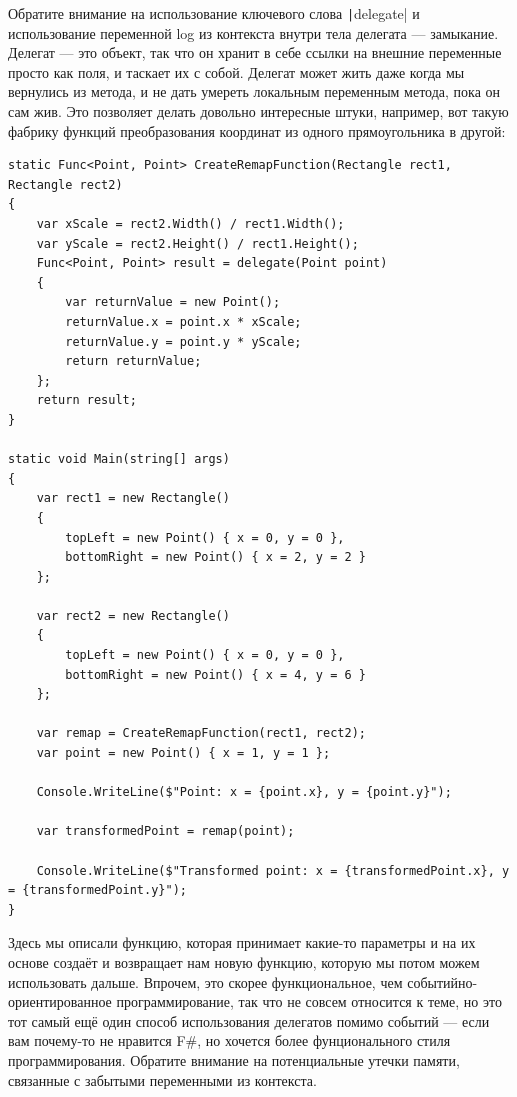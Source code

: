 \documentclass[a5paper]{article}
\begin{document}
Обратите внимание на использование ключевого слова \texttt|delegate| и использование переменной log из контекста внутри тела делегата --- замыкание. Делегат --- это объект, так что он хранит в себе ссылки на внешние переменные просто как поля, и таскает их с собой. Делегат может жить даже когда мы вернулись из метода, и не дать умереть локальным переменным метода, пока он сам жив. Это позволяет делать довольно интересные штуки, например, вот такую фабрику функций преобразования координат из одного прямоугольника в другой:

\begin{verbatim}
static Func<Point, Point> CreateRemapFunction(Rectangle rect1, Rectangle rect2)
{
    var xScale = rect2.Width() / rect1.Width();
    var yScale = rect2.Height() / rect1.Height();
    Func<Point, Point> result = delegate(Point point)
    {
        var returnValue = new Point();
        returnValue.x = point.x * xScale;
        returnValue.y = point.y * yScale;
        return returnValue;
    };
    return result;
}

static void Main(string[] args)
{
    var rect1 = new Rectangle()
    {
        topLeft = new Point() { x = 0, y = 0 },
        bottomRight = new Point() { x = 2, y = 2 }
    };

    var rect2 = new Rectangle()
    {
        topLeft = new Point() { x = 0, y = 0 },
        bottomRight = new Point() { x = 4, y = 6 }
    };

    var remap = CreateRemapFunction(rect1, rect2);
    var point = new Point() { x = 1, y = 1 };

    Console.WriteLine($"Point: x = {point.x}, y = {point.y}");

    var transformedPoint = remap(point);

    Console.WriteLine($"Transformed point: x = {transformedPoint.x}, y = {transformedPoint.y}");
}
\end{verbatim}

Здесь мы описали функцию, которая принимает какие-то параметры и на их основе создаёт и возвращает нам новую функцию, которую мы потом можем использовать дальше. Впрочем, это скорее функциональное, чем событийно-ориентированное программирование, так что не совсем относится к теме, но это тот самый ещё один способ использования делегатов помимо событий --- если вам почему-то не нравится F\#, но хочется более фунционального стиля программирования. Обратите внимание на потенциальные утечки памяти, связанные с забытыми переменными из контекста.
\end{document}
